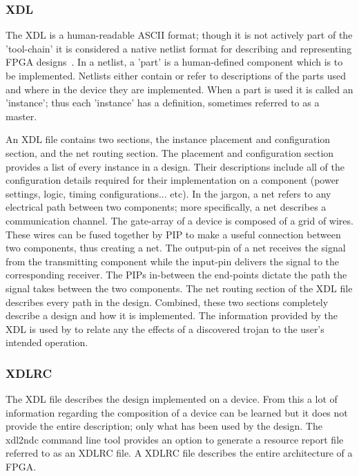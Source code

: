 \subsubsection{\acrfull{XDL}} \label{sec:XDL}
The \acrfull{XDL} is a human-readable ASCII format; though it is not actively part of the 'tool-chain' it is considered a native netlist format for describing and representing \acrshort{FPGA} designs~\cite{xdlTutorial}. 
In a netlist, a 'part' is a human-defined component which is to be implemented.
Netlists either contain or refer to descriptions of the parts used and where in the device they are implemented.
When a part is used it is called an 'instance'; thus each 'instance' has a definition, sometimes referred to as a master.

An \acrshort{XDL} file contains two sections, the instance placement and configuration section, and the net routing section. 
The placement and configuration section provides a list of every instance in a design. 
Their descriptions include all of the configuration details required for their implementation on a component (power settings, logic, timing configurations... etc).
In the \Xilinx jargon, a net refers to any electrical path between two components; more specifically, a net describes a communication channel.
The gate-array of a \Xilinx device is composed of a grid of wires.
These wires can be fused together by \acrfull{PIP} to make a useful connection between two components, thus creating a net.
The output-pin of a net receives the signal from the transmitting component while the input-pin delivers the signal to the corresponding receiver.
The \acrshort{PIP}s in-between the end-points dictate the path the signal takes between the two components.
The net routing section of the \acrshort{XDL} file describes every path in the design.
Combined, these two sections completely describe a design and how it is implemented.
The information provided by the \acrshort{XDL} is used by \NameNoPeriod to relate any the effects of a discovered trojan to the user's intended operation. 
\subsubsection{XDLRC} \label{sec:XDLRC}
The \acrshort{XDL} file describes the design implemented on a device.
From this a lot of information regarding the composition of a \Xilinx device can be learned but it does not provide the entire description; only what has been used by the design.
The \gls{xdl2ndc} command line tool provides an option to generate a resource report file referred to as an XDLRC file. 
A XDLRC file describes the entire architecture of a \Xilinx \acrshort{FPGA}.

